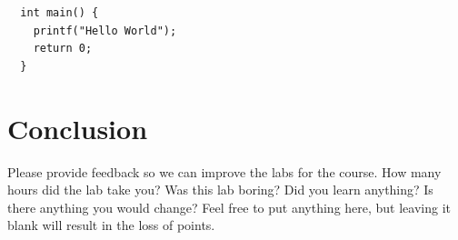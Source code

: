 \documentclass[11pt]{article}
\begin{document}
\begin{verbatim}
  int main() {
    printf("Hello World");
    return 0;
  }
\end{verbatim}

\section{Conclusion}
\label{sec:conclusion}
Please provide feedback so we can improve the labs for the course. How many
hours did the lab take you? Was this lab boring? Did you learn anything? Is
there anything you would change? Feel free to put anything here, but leaving it
blank will result in the loss of points.



\end{document}
